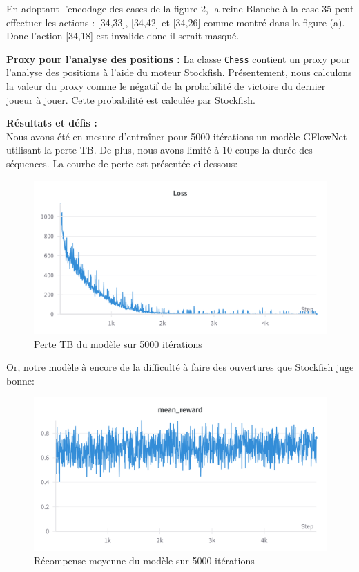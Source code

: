 \documentclass[11pt]{article}
\begin{document}
En adoptant l'encodage des cases de la figure 2, la reine Blanche à la
case 35 peut effectuer les actions : [34,33], [34,42] et [34,26] comme
montré dans la figure (a).  Donc l'action [34,18] est invalide donc il
serait masqué.

\textbf{Proxy pour l'analyse des positions :} La classe \texttt{Chess}
contient un proxy pour l'analyse des positions à l'aide du moteur
Stockfish. Présentement, nous calculons la valeur du proxy comme le
négatif de la probabilité de victoire du dernier joueur à jouer. Cette
probabilité est calculée par Stockfish.

\textbf{Résultats et défis :} \\
Nous avons été en mesure d'entraîner pour 5000 itérations un modèle
GFlowNet utilisant la perte TB. De plus, nous avons limité à 10 coups
la durée des séquences. La courbe de perte est présentée ci-dessous:
\begin{figure}[H]
  \centering \includegraphics[scale=0.15]{tb-loss.png}
  \caption{Perte TB du modèle sur 5000 itérations}
	\label{tbloss}
\end{figure}
Or, notre modèle à encore de la difficulté à faire des ouvertures que
Stockfish juge bonne:
\begin{figure}[H]
  \centering \includegraphics[scale=0.15]{tb-mean-reward.png}
  \caption{Récompense moyenne du modèle sur 5000 itérations}
	\label{tbreward}
\end{figure}
\end{document}
